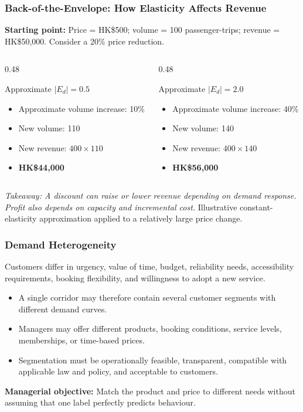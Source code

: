 \documentclass{beamer}
\begin{document}
\begin{frame}[t,shrink=10]
\frametitle{Back-of-the-Envelope: How Elasticity Affects Revenue}
\textbf{Starting point:} Price = HK\$500; volume = 100 passenger-trips; revenue = HK\$50,000. Consider a 20\% price reduction.
\begin{columns}[T]
\begin{column}{0.48\textwidth}\begin{block}{Approximate $|E_d|=0.5$}
\begin{itemize}
\item Approximate volume increase: 10\%
\item New volume: 110
\item New revenue: $400\times110$
\item \textbf{HK\$44,000}
\end{itemize}\end{block}\end{column}
\begin{column}{0.48\textwidth}\begin{block}{Approximate $|E_d|=2.0$}
\begin{itemize}
\item Approximate volume increase: 40\%
\item New volume: 140
\item New revenue: $400\times140$
\item \textbf{HK\$56,000}
\end{itemize}\end{block}\end{column}
\end{columns}
\textit{Takeaway: A discount can raise or lower revenue depending on demand response. Profit also depends on capacity and incremental cost.}
\vfill{\tiny Illustrative constant-elasticity approximation applied to a relatively large price change.}
\end{frame}

\begin{frame}[t]
\frametitle{Demand Heterogeneity}
Customers differ in urgency, value of time, budget, reliability needs, accessibility requirements, booking flexibility, and willingness to adopt a new service.
\begin{itemize}
\item A single corridor may therefore contain several customer segments with different demand curves.
\item Managers may offer different products, booking conditions, service levels, memberships, or time-based prices.
\item Segmentation must be operationally feasible, transparent, compatible with applicable law and policy, and acceptable to customers.
\end{itemize}
\textbf{Managerial objective:} Match the product and price to different needs without assuming that one label perfectly predicts behaviour.
\end{frame}
\end{document}
